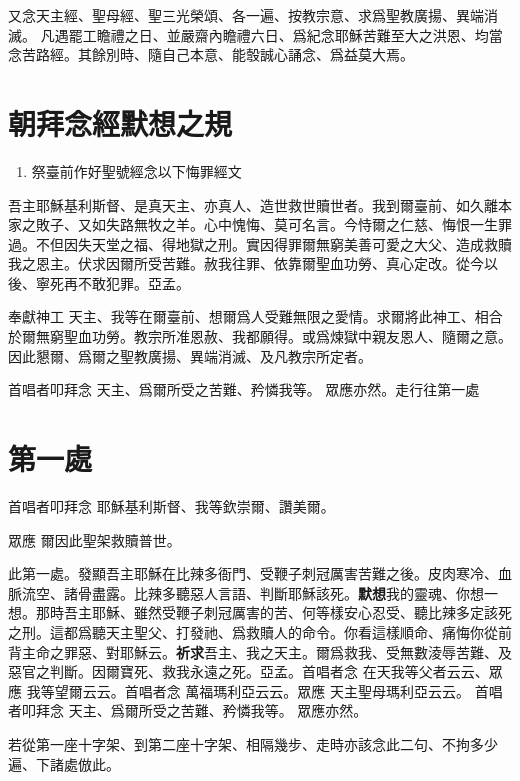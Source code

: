 又念天主經、聖母經、聖三光榮頌、各一遍、按教宗意、求爲聖教廣揚、異端消滅。
凡遇罷工瞻禮之日、並嚴齋內瞻禮六日、爲紀念耶穌苦難至大之洪恩、均當念苦路經。其餘別時、隨自己本意、能彀誠心誦念、爲益莫大焉。

\section*{朝拜念經默想之規}
\begin{enumerate}
    \item[]{\small 祭臺前作好聖號經念以下悔罪經文}
\end{enumerate}
吾主耶穌基利斯督、是真天主、亦真人、造世救世贖世者。我到爾臺前、如久離本家之敗子、又如失路無牧之羊。心中愧悔、莫可名言。今恃爾之仁慈、悔恨一生罪過。不但因失天堂之福、得地獄之刑。實因得罪爾無窮美善可愛之大父、造成救贖我之恩主。伏求因爾所受苦難。赦我往罪、依靠爾聖血功勞、真心定改。從今以後、寧死再不敢犯罪。{\cspace}亞孟。

{\small 奉獻神工} 天主、我等在爾臺前、想爾爲人受難無限之愛情。求爾將此神工、相合於爾無窮聖血功勞。教宗所准恩赦、我都願得。或爲煉獄中親友恩人、隨爾之意。因此懇爾、爲爾之聖教廣揚、異端消滅、及凡教宗所定者。

{\small 首唱者叩拜念} 天主、爲爾所受之苦難、矜憐我等。 {\small 眾應亦然。走行往第一處}

\section*{第一處}
{\small 首唱者叩拜念} 耶穌基利斯督、我等欽崇爾、讚美爾。

{\small 眾應} 爾因此聖架救贖普世。 

此第一處。發顯吾主耶穌在比辣多衙門、受鞭子刺冠厲害苦難之後。皮肉寒冷、血脈流空、諸骨盡露。比辣多聽惡人言語、判斷耶穌該死。\cspace\textbf{默想}我的靈魂、你想一想。那時吾主耶穌、雖然受鞭子刺冠厲害的苦、何等樣安心忍受、聽比辣多定該死之刑。這都爲聽天主聖父、打發祂、爲救贖人的命令。你看這樣順命、痛悔你從前背主命之罪惡、對耶穌云。\cspace\textbf{祈求}吾主、我之天主。爾爲救我、受無數淩辱苦難、及惡官之判斷。因爾寶死、救我永遠之死。{\cspace}亞孟。{\small 首唱者念} 在天我等父者{\small 云云}、{\small 眾應} 我等望爾{\small 云云}。{\small 首唱者念} 萬福瑪利亞{\small 云云}。{\small 眾應} 天主聖母瑪利亞{\small 云云}。 {\small 首唱者叩拜念} 天主、爲爾所受之苦難、矜憐我等。 {\small 眾應亦然。}

{\small 若從第一座十字架、到第二座十字架、相隔幾步、走時亦該念此二句、不拘多少遍、下諸處倣此。}

